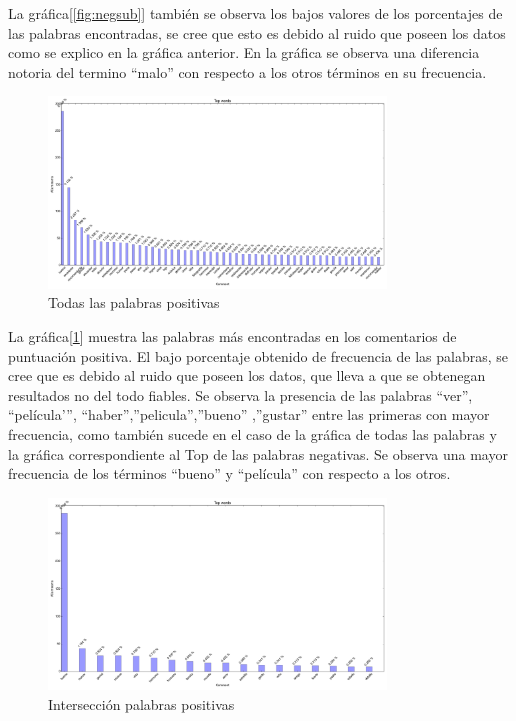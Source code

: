 \documentclass[12pt]{article}
\begin{document}
La gráfica[\ref{fig:negsub}] también se observa los bajos valores de los porcentajes de las palabras encontradas, se cree que esto es debido al ruido que poseen los datos como se explico en la gráfica anterior. En la gráfica se observa una diferencia notoria del termino “malo” con respecto a los otros términos en su frecuencia.


\begin{figure}[!h]
  \centering
    \includegraphics[width=0.8\textwidth]{./fig/PositiveWords.png}
  \caption{Todas las palabras positivas}
  \label{fig:pos}
\end{figure} 

La gráfica[\ref{fig:pos}] muestra las palabras más encontradas en los comentarios de puntuación positiva. El bajo porcentaje obtenido de frecuencia de las palabras, se cree que es debido al ruido que poseen los datos, que lleva a que se obtenegan resultados no del todo fiables. Se observa la presencia de las palabras “ver”, “película'”, “haber”,”pelicula”,”bueno” ,”gustar” entre las primeras con mayor frecuencia, como también sucede en el caso de la gráfica de todas las palabras y la gráfica correspondiente al Top de las palabras negativas. Se observa una mayor frecuencia de los términos “bueno” y “película” con respecto a los otros.


\begin{figure}[!h]
  \centering
    \includegraphics[width=0.8\textwidth]{./fig/PositiveSubjetiveWords.png}
  \caption{Intersección palabras positivas}
  \label{fig:possub}
\end{figure} 
\end{document}

